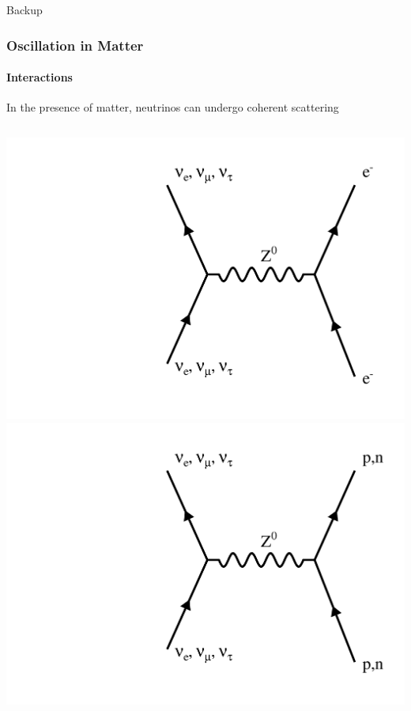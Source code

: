 \documentclass[10pt,professionalfonts,xcolor=table]{beamer}
\begin{document}
\appendix
\begin{frame}
\centering \huge \textcolor{custom_red}{Backup}
\end{frame}
\frame
{
  \frametitle{Oscillation in Matter}
  \framesubtitle{Interactions}
  \begin{itemize}
  \bang In the presence of matter, neutrinos can undergo coherent scattering
  \begin{columns}[c]
    \centering
    \includegraphics[width=\textwidth, angle=-90]{figures/feynman/ncElec.pdf}
      \centering
      \includegraphics[width=\textwidth, angle=-90]{figures/feynman/ncHad.pdf}
      \centering

\end{columns}
\end{itemize}}
\end{document}
